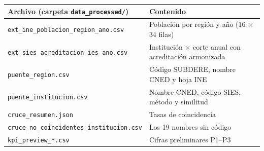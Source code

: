 \documentclass[11pt,a4paper]{article}
\begin{document}
\begin{center}
\small
\begin{tabularx}{\textwidth}{@{}lY@{}}
\toprule
\textbf{Archivo (carpeta \texttt{data\_processed/})} & \textbf{Contenido} \\
\midrule
\texttt{ext\_ine\_poblacion\_region\_ano.csv} & Poblaci\'on por regi\'on y a\~no (16 $\times$ 34 filas) \\
\texttt{ext\_sies\_acreditacion\_ies\_ano.csv} & Instituci\'on $\times$ corte anual con acreditaci\'on armonizada \\
\texttt{puente\_region.csv} & C\'odigo SUBDERE, nombre CNED y hoja INE \\
\texttt{puente\_institucion.csv} & Nombre CNED, c\'odigo SIES, m\'etodo y similitud \\
\texttt{cruce\_resumen.json} & Tasas de coincidencia \\
\texttt{cruce\_no\_coincidentes\_institucion.csv} & Los 19 nombres sin c\'odigo \\
\texttt{kpi\_preview\_*.csv} & Cifras preliminares P1--P3 \\
\bottomrule
\end{tabularx}
\end{center}
\end{document}
